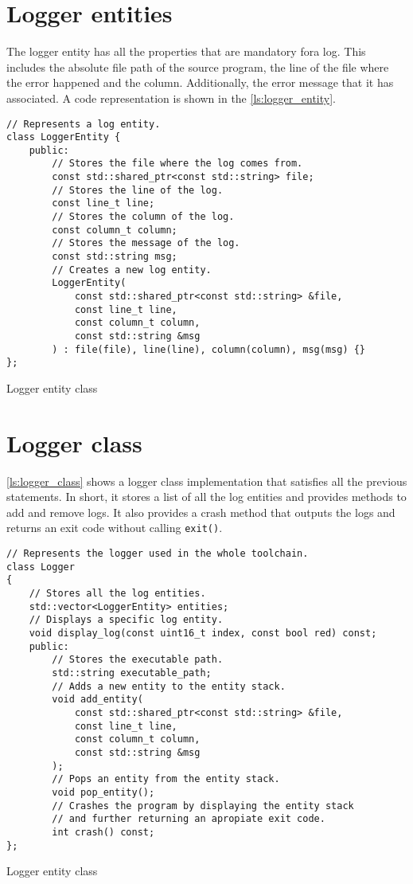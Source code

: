 \section{Logger entities}

The logger entity has all the properties that are mandatory fora log.
This includes the absolute file path of the source program, the line of the file where the error happened
and the column. Additionally, the error message that it has associated. A code representation is shown in
the \autoref{ls:logger_entity}.

\begin{listing}[H]
\begin{verbatim}
// Represents a log entity.
class LoggerEntity {
    public:
        // Stores the file where the log comes from.
        const std::shared_ptr<const std::string> file;
        // Stores the line of the log.
        const line_t line;
        // Stores the column of the log.
        const column_t column;
        // Stores the message of the log.
        const std::string msg;
        // Creates a new log entity.
        LoggerEntity(
            const std::shared_ptr<const std::string> &file,
            const line_t line,
            const column_t column,
            const std::string &msg
        ) : file(file), line(line), column(column), msg(msg) {}
};
\end{verbatim}
\caption{Logger entity class}
\label{ls:logger_entity}
\end{listing}

\section{Logger class}

\autoref{ls:logger_class} shows a logger class implementation that satisfies all the previous statements.
In short, it stores a list of all the log entities and provides methods to add and remove logs. It also provides a crash
method that outputs the logs and returns an exit code without calling \texttt{exit()}.

\begin{listing}[H]
\begin{verbatim}
// Represents the logger used in the whole toolchain.
class Logger
{
    // Stores all the log entities.
    std::vector<LoggerEntity> entities;
    // Displays a specific log entity.
    void display_log(const uint16_t index, const bool red) const;
    public:
        // Stores the executable path.
        std::string executable_path;
        // Adds a new entity to the entity stack.
        void add_entity(
            const std::shared_ptr<const std::string> &file,
            const line_t line,
            const column_t column,
            const std::string &msg
        );
        // Pops an entity from the entity stack.
        void pop_entity();
        // Crashes the program by displaying the entity stack
        // and further returning an apropiate exit code.
        int crash() const;
};
\end{verbatim}
\caption{Logger entity class}
\label{ls:logger_class}
\end{listing}

